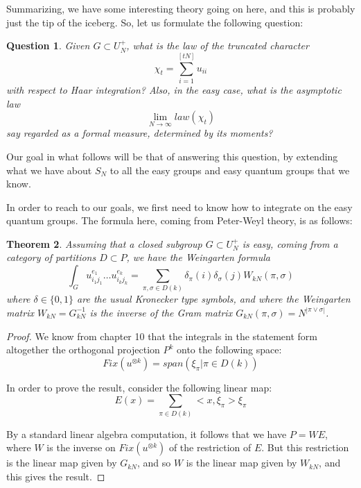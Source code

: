 \documentclass[12pt]{amsbook}
\newtheorem{theorem}{Theorem}[chapter]
\newtheorem{question}[theorem]{Question}
\begin{document}
Summarizing, we have some interesting theory going on here, and this is probably just the tip of the iceberg. So, let us formulate the following question: 

\begin{question}
Given $G\subset U_N^+$, what is the law of the truncated character
$$\chi_t=\sum_{i=1}^{[tN]}u_{ii}$$
with respect to Haar integration? Also, in the easy case, what is the asymptotic law
$$\lim_{N\to\infty}law(\chi_t)$$
say regarded as a formal measure, determined by its moments?
\end{question}

Our goal in what follows will be that of answering this question, by extending what we have about $S_N$ to all the easy groups and easy quantum groups that we know.

\bigskip

In order to reach to our goals, we first need to know how to integrate on the easy quantum groups. The formula here, coming from Peter-Weyl theory, is as follows:


\begin{theorem}
Assuming that a closed subgroup $G\subset U_N^+$ is easy, coming from a category of partitions $D\subset P$, we have the Weingarten formula
$$\int_Gu_{i_1j_1}^{e_1}\ldots u_{i_kj_k}^{e_k}=\sum_{\pi,\sigma\in D(k)}\delta_\pi(i)\delta_\sigma(j)W_{kN}(\pi,\sigma)$$
where $\delta\in\{0,1\}$ are the usual Kronecker type symbols, and where the Weingarten matrix $W_{kN}=G_{kN}^{-1}$ is the inverse of the Gram matrix $G_{kN}(\pi,\sigma)=N^{|\pi\vee\sigma|}$. 
\end{theorem}

\begin{proof}
We know from chapter 10 that the integrals in the statement form altogether the orthogonal projection $P^k$ onto the following space:
$$Fix(u^{\otimes k})=span\left(\xi_\pi\Big|\pi\in D(k)\right)$$

In order to prove the result, consider the following linear map:
$$E(x)=\sum_{\pi\in D(k)}<x,\xi_\pi>\xi_\pi$$

By a standard linear algebra computation, it follows that we have $P=WE$, where $W$ is the inverse on $Fix(u^{\otimes k})$ of the restriction of $E$. But this restriction is the linear map given by $G_{kN}$, and so $W$ is the linear map given by $W_{kN}$, and this gives the result.
\end{proof}
\end{document}
